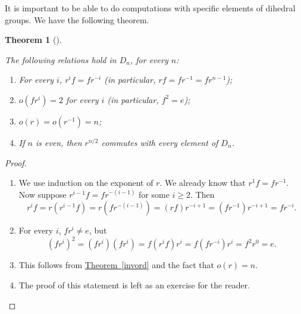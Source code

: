 \documentclass[10pt,]{book}
\theoremstyle{plain}
\newtheorem{theorem}{Theorem}[section]
\theoremstyle{definition}
\theoremstyle{definition}
\theoremstyle{definition}
\theoremstyle{definition}
\numberwithin{equation}{section}
\begin{document}
    It is important to be able to do computations with specific elements of dihedral
    groups. We have the following theorem.
\begin{theorem}[{}]\label{diords}

        The following relations hold in \(D_n\), for every \(n\):
        \leavevmode%
\begin{enumerate}
\item\hypertarget{li-349}{}
              For every \(i\), \(r^if=fr^{-i}\) (in particular, \(rf=fr^{-1}=fr^{n-1}\));
\item\hypertarget{li-350}{}
              \(o(fr^i)=2\) for every \(i\) (in particular, \(f^2=e\));
\item\hypertarget{li-351}{}
              \(o(r)=o(r^{-1})=n\);
\item\hypertarget{li-352}{}
              If \(n\) is even, then \(r^{n/2}\) commutes with every element of \(D_n\).
\end{enumerate}

\end{theorem}
\begin{proof}\hypertarget{proof-34}{}
\leavevmode%
\begin{enumerate}
\item\hypertarget{li-353}{}
          We use induction on the exponent of \(r\). We already know that \(r^1f=fr^{-1}\).  Now suppose \(r^{i-1}f=fr^{-(i-1)}\) for some \(i\geq 2\).  Then
\begin{equation*}

            r^if=r(r^{i-1}f)=r(fr^{-(i-1)})=(rf)r^{-i+1}=(fr^{-1})r^{-i+1}=fr^{-i}.
          
\end{equation*}

\item\hypertarget{li-354}{}
          For every \(i\), \(fr^i\neq e\), but
\begin{equation*}

            (fr^i)^2=(fr^i)(fr^i)=f(r^if)r^i=f(fr^{-i})r^i=f^2r^0=e.
          
\end{equation*}

\item\hypertarget{li-355}{}
          This follows from \hyperref[invord]{Theorem~\ref{invord}} and the fact that \(o(r)=n\).
\item\hypertarget{li-356}{}
          The proof of this statement is left as an exercise for the reader. 
\end{enumerate}
\end{proof}
\end{document}

